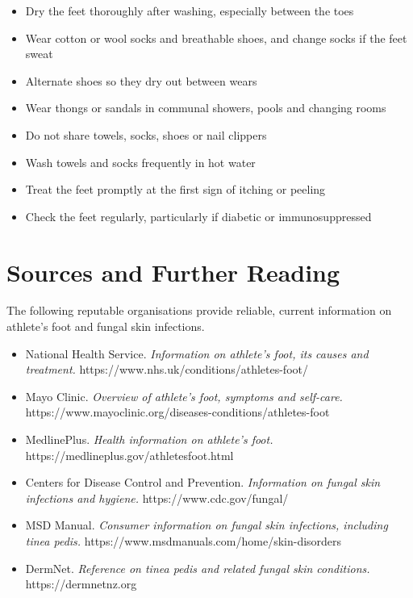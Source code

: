 \begin{itemize}
    \item Dry the feet thoroughly after washing, especially between the toes
    \item Wear cotton or wool socks and breathable shoes, and change socks if the feet sweat
    \item Alternate shoes so they dry out between wears
    \item Wear thongs or sandals in communal showers, pools and changing rooms
    \item Do not share towels, socks, shoes or nail clippers
    \item Wash towels and socks frequently in hot water
    \item Treat the feet promptly at the first sign of itching or peeling
    \item Check the feet regularly, particularly if diabetic or immunosuppressed
\end{itemize}

\section*{Sources and Further Reading}
The following reputable organisations provide reliable, current information on athlete's foot and fungal skin infections.

\begin{itemize}
    \item National Health Service. \textit{Information on athlete's foot, its causes and treatment.} https://www.nhs.uk/conditions/athletes-foot/
    \item Mayo Clinic. \textit{Overview of athlete's foot, symptoms and self-care.} https://www.mayoclinic.org/diseases-conditions/athletes-foot
    \item MedlinePlus. \textit{Health information on athlete's foot.} https://medlineplus.gov/athletesfoot.html
    \item Centers for Disease Control and Prevention. \textit{Information on fungal skin infections and hygiene.} https://www.cdc.gov/fungal/
    \item MSD Manual. \textit{Consumer information on fungal skin infections, including tinea pedis.} https://www.msdmanuals.com/home/skin-disorders
    \item DermNet. \textit{Reference on tinea pedis and related fungal skin conditions.} https://dermnetnz.org
\end{itemize}
